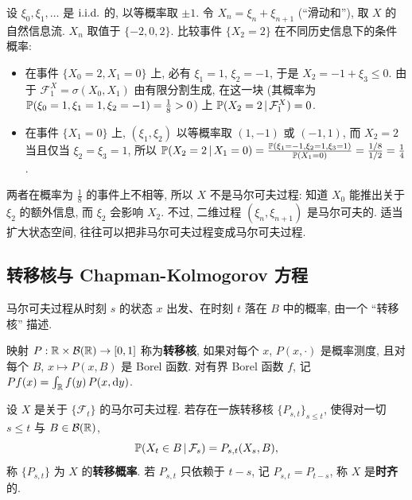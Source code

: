 \begin{example}[不是马尔可夫过程的例子]\label{ex:non-markov}
设 $\xi_0,\xi_1,\dots$ 是 $\iid$ 的, 以等概率取 $\pm1$. 令 $X_n=\xi_n+\xi_{n+1}$ (``滑动和''), 取 $X$ 的自然信息流. $X_n$ 取值于 $\{-2,0,2\}$. 比较事件 $\{X_2=2\}$ 在不同历史信息下的条件概率:
\begin{itemize}
\item 在事件 $\{X_0=2,X_1=0\}$ 上, 必有 $\xi_1=1$, $\xi_2=-1$, 于是 $X_2=-1+\xi_3\le0$. 由于 $\mathcal{F}^X_1=\sigma(X_0,X_1)$ 由有限分割生成, 在这一块 (其概率为 $\P(\xi_0=1,\xi_1=1,\xi_2=-1)=\frac{1}{8}>0$) 上 $\P(X_2=2\,|\,\mathcal{F}^X_1)=0$.
\item 在事件 $\{X_1=0\}$ 上, $(\xi_1,\xi_2)$ 以等概率取 $(1,-1)$ 或 $(-1,1)$, 而 $X_2=2$ 当且仅当 $\xi_2=\xi_3=1$, 所以 $\P(X_2=2\,|\,X_1=0)=\frac{\P(\xi_1=-1,\xi_2=1,\xi_3=1)}{\P(X_1=0)}=\frac{1/8}{1/2}=\frac{1}{4}$.
\end{itemize}
两者在概率为 $\frac{1}{8}$ 的事件上不相等, 所以 $X$ 不是马尔可夫过程: 知道 $X_0$ 能推出关于 $\xi_2$ 的额外信息, 而 $\xi_2$ 会影响 $X_2$. 不过, 二维过程 $(\xi_n,\xi_{n+1})$ 是马尔可夫的. 适当扩大状态空间, 往往可以把非马尔可夫过程变成马尔可夫过程.
\end{example}

\subsection{转移核与 Chapman-Kolmogorov 方程}

马尔可夫过程从时刻 $s$ 的状态 $x$ 出发、在时刻 $t$ 落在 $B$ 中的概率, 由一个 ``转移核'' 描述.

\begin{definition}[转移核]\label{def:kernel}
映射 $P:\R\times\mathcal{B}(\R)\to[0,1]$ 称为\textbf{转移核}, 如果对每个 $x$, $P(x,\cdot)$ 是概率测度, 且对每个 $B$, $x\mapsto P(x,B)$ 是 Borel 函数. 对有界 Borel 函数 $f$, 记 $Pf(x)=\int_{\R}f(y)\,P(x,\dd y)$.
\end{definition}

\begin{definition}[转移概率]\label{def:transition}
设 $X$ 是关于 $\{\mathcal{F}_t\}$ 的马尔可夫过程. 若存在一族转移核 $\{P_{s,t}\}_{s\le t}$, 使得对一切 $s\le t$ 与 $B\in\mathcal{B}(\R)$,
\[
\P(X_t\in B\,|\,\mathcal{F}_s)=P_{s,t}(X_s,B),
\]
称 $\{P_{s,t}\}$ 为 $X$ 的\textbf{转移概率}. 若 $P_{s,t}$ 只依赖于 $t-s$, 记 $P_{s,t}=P_{t-s}$, 称 $X$ 是\textbf{时齐}的.
\end{definition}

